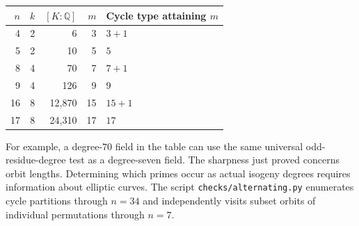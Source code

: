 \begin{center}
\begin{tabular}{rrrrl}
\toprule
$n$ & $k$ & $[K:\mathbb Q]$ & $m$ & Cycle type attaining $m$\\
\midrule
4 & 2 & 6 & 3 & $3+1$\\
5 & 2 & 10 & 5 & $5$\\
8 & 4 & 70 & 7 & $7+1$\\
9 & 4 & 126 & 9 & $9$\\
16 & 8 & 12,870 & 15 & $15+1$\\
17 & 8 & 24,310 & 17 & $17$\\
\bottomrule
\end{tabular}
\end{center}
For example, a degree-$70$ field in the table can use the same universal
odd-residue-degree test as a degree-seven field. The sharpness just proved
concerns orbit lengths. Determining which primes occur as actual isogeny
degrees requires information about elliptic curves. The script
\texttt{checks/alternating.py} enumerates cycle partitions through $n=34$
and independently visits subset orbits of individual permutations through
$n=7$.
